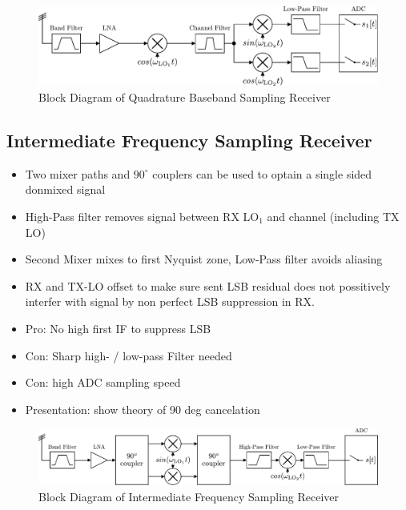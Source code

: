 \begin{figure}[ht]
  \centering
  \includegraphics[width=\textwidth]{figures/quad_base_rx_block_diagram}
  \caption{Block Diagram of Quadrature Baseband Sampling Receiver}
  \label{fig:rx_quad_base_bd}
\end{figure}

\subsection{Intermediate Frequency Sampling Receiver}
\begin{itemize}
\item Two mixer paths and $90^\circ$ couplers can be used to optain a
  single sided donmixed signal
\item High-Pass filter removes signal between RX $\text{LO}_1$ and channel (including TX LO)
\item Second Mixer mixes to first Nyquist zone, Low-Pass filter avoids aliasing
\item RX and TX-LO offset to make sure sent LSB residual does not possitively
  interfer with signal by non perfect LSB suppression in RX.
\item Pro: No high first IF to suppress LSB
\item Con: Sharp high- / low-pass Filter needed
\item Con: high ADC sampling speed
\item Presentation: show theory of 90 deg cancelation
\end{itemize}

\begin{figure}[ht]
  \centering
  \includegraphics[width=\textwidth]{figures/if_rx_block_diagram}
  \caption{Block Diagram of Intermediate Frequency Sampling Receiver}
  \label{fig:rx_if_bd}
\end{figure}

